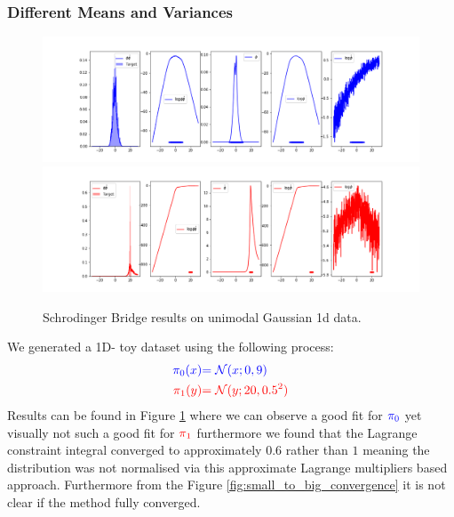 \documentclass[a4paper,12pt,twoside,openright]{report}
\theoremstyle{definition}
\begin{document}
\subsubsection{Different Means and Variances}
\begin{figure}
    \centering
    \includegraphics[scale=0.42,trim={4.3cm 0.2cm 1.5cm 0}, clip]{images/Pavon/Forward_bigvar_test_working.png}\\\vspace{-0.2cm}
    \includegraphics[scale=0.42,trim={4.3cm 0 1.5cm 1.5cm}, clip]{images/Pavon/Backward_bigvar_test_working.png} 
    \caption{Schrodinger Bridge results on unimodal Gaussian 1d data. }
    \label{fig:small_to_big}
\end{figure}
We generated a 1D- toy dataset using the following process:
\begin{align*}
     \color{blue}{\pi_0(x)} &\color{blue}{= {\mathcal{N}}(x; 0,  9)} \\
    \color{red}{\pi_1(y)} &\color{red}{= {\mathcal{N}}(y; 20, 0.5 ^2)} 
\end{align*}
Results can be found in Figure \ref{fig:small_to_big} where we can observe a good fit for $\color{blue}{\pi_0}$ yet visually not such a good fit for $\color{red}{\pi_1}$ furthermore we found that the Lagrange constraint integral converged to approximately $0.6$ rather than $1$ meaning the distribution was not normalised via this approximate Lagrange multipliers based approach. Furthermore from the Figure \ref{fig:small_to_big_convergence} it is not clear if the method fully converged. 
\end{document}
